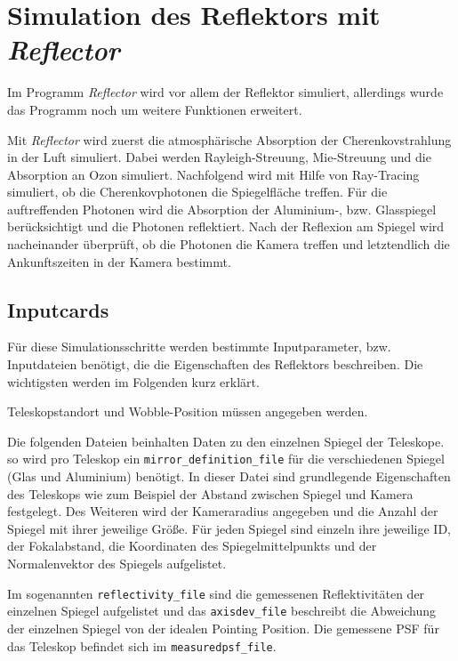 \section{Simulation des Reflektors mit \textit{Reflector}}
\label{sec:Reflector}
Im Programm \textit{Reflector}\cite{Reflector} wird vor allem der Reflektor simuliert, allerdings wurde das Programm noch um weitere Funktionen erweitert.

Mit \textit{Reflector} wird zuerst die atmosphärische Absorption der Cherenkovstrahlung in der Luft simuliert. 
Dabei werden Rayleigh-Streuung, Mie-Streuung und die Absorption an Ozon simuliert.
Nachfolgend wird mit Hilfe von Ray-Tracing simuliert, ob die Cherenkovphotonen die Spiegelfläche treffen.
Für die auftreffenden Photonen wird die Absorption der Aluminium-, bzw. Glasspiegel berücksichtigt und die Photonen reflektiert.
Nach der Reflexion am Spiegel wird nacheinander überprüft, ob die Photonen die Kamera treffen und letztendlich die Ankunftszeiten in der Kamera bestimmt.

\subsection{Inputcards}
Für diese Simulationsschritte werden bestimmte Inputparameter, bzw. Inputdateien benötigt, die die Eigenschaften des Reflektors beschreiben.
Die wichtigsten werden im Folgenden kurz erklärt.


Teleskopstandort und Wobble-Position müssen angegeben werden.

Die folgenden Dateien beinhalten Daten zu den einzelnen Spiegel der Teleskope.
so wird pro Teleskop ein \texttt{mirror\_definition\_file} für die verschiedenen Spiegel (Glas und Aluminium) benötigt.
In dieser Datei sind grundlegende Eigenschaften des Teleskops wie zum Beispiel der Abstand zwischen Spiegel und Kamera festgelegt. 
Des Weiteren wird der Kameraradius angegeben und die Anzahl der Spiegel mit ihrer jeweilige Größe.
Für jeden Spiegel sind einzeln ihre jeweilige ID, der Fokalabstand, die Koordinaten des Spiegelmittelpunkts und der Normalenvektor des Spiegels aufgelistet.

Im sogenannten \texttt{reflectivity\_file} sind die gemessenen Reflektivitäten der einzelnen Spiegel aufgelistet und das \texttt{axisdev\_file} beschreibt die Abweichung der einzelnen Spiegel von der idealen Pointing Position.
Die gemessene PSF für das Teleskop befindet sich im \texttt{measuredpsf\_file}.


